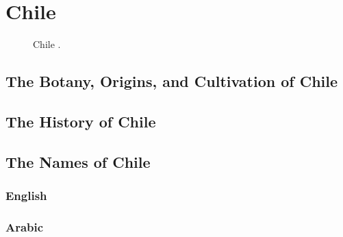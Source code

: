 \section{Chile}
\label{sec:chile}





\begin{figure}[!ht]
	\vspace{-4ex}
	\centering
	\caption{Chile \taxon{}.}
	\label{fig:chile_imgs}
\end{figure}

\subsection{The Botany, Origins, and Cultivation of Chile}

\subsection{The History of Chile}

\subsection{The Names of Chile}

\subsubsection{English}





\subsubsection{Arabic}

